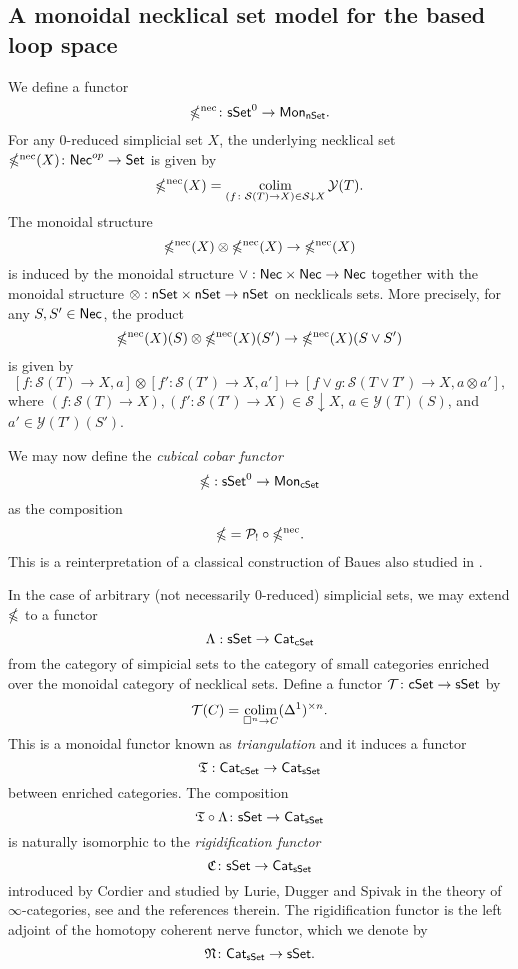 \subsection{A monoidal necklical set model for the based loop space}
We define a functor 
$$\mathbb{\Omega}^{\text{nec}} \colon \mathsf{sSet}^0 \to \mathsf{Mon}_{\mathsf{nSet}}.$$
For any $0$-reduced simplicial set $X$, the underlying necklical set $\mathbb{\Omega}^{\text{nec}}(X) \colon \mathsf{Nec}^{op} \to \mathsf{Set}$ is given by
$$\mathbb{\Omega}^{\text{nec}}(X) = \operatorname*{colim}_{(f \colon \mathcal{S}(T) \to X) \in  \mathcal{S} \downarrow X} \mathcal{Y}(T).$$
The monoidal structure $$\mathbb{\Omega}^{\text{nec}}(X) \otimes \mathbb{\Omega}^{\text{nec}}(X) \to \mathbb{\Omega}^{\text{nec}}(X)$$
is induced by the monoidal structure $\vee: \mathsf{Nec} \times \mathsf{Nec} \to \mathsf{Nec}$ together with the monoidal structure $\otimes: \mathsf{nSet} \times \mathsf{nSet} \to \mathsf{nSet}$ on necklicals sets. More precisely, for any $S, S' \in \mathsf{Nec}$, the product $$\mathbb{\Omega}^{\text{nec}}(X)(S) \otimes \mathbb{\Omega}^{\text{nec}}(X)(S') \to \mathbb{\Omega}^{\text{nec}}(X)(S \vee S')$$ is given by $$[f\colon \mathcal{S}(T) \to X, a] \otimes [f'\colon \mathcal{S}(T') \to X, a'] \mapsto [f \vee g\colon \mathcal{S}(T\vee T') \to X, a \otimes  a'],$$
where $(f\colon \mathcal{S}(T) \to X), (f'\colon \mathcal{S}(T') \to X) \in \mathcal{S} \downarrow X$, $a\in \mathcal{Y}(T)(S)$, and $a'\in \mathcal{Y}(T')(S')$.

We may now define the \textit{cubical cobar functor} $$\mathbb{\Omega}: \mathsf{sSet}^0 \to \mathsf{Mon}_{\mathsf{cSet}}$$ as the composition $$\mathbb{\Omega}= \mathcal{P}_! \circ \mathbb{\Omega}^{\text{nec}}.$$ This is a reinterpretation of a classical construction of Baues \cite{Baues} also studied in \cite{rivera-zeinalian-cubical}. 


\begin{remark}

In the case of arbitrary (not necessarily $0$-reduced) simplicial sets, we may extend  $\mathbb{\Omega}$ to a functor
$$\Lambda: \mathsf{sSet} \to \mathsf{Cat}_{\mathsf{cSet}}$$ from the category of simpicial sets to the category of small categories enriched over the monoidal category of necklical sets. Define a functor $\mathcal{T} \colon \mathsf{cSet} \to \mathsf{sSet}$ by $$\mathcal{T}(C) = \operatorname*{colim}_{\square^n \to C} (\Delta^1)^{\times n}.$$ This is a monoidal functor known as \textit{triangulation} and it induces a functor $$\mathfrak{T}: \mathsf{Cat}_{\mathsf{cSet}} \to \mathsf{Cat}_{\mathsf{sSet}}$$ between enriched categories. The composition 
$$\mathfrak{T} \circ \Lambda \colon \mathsf{sSet} \to \mathsf{Cat}_{\mathsf{sSet}}$$ is naturally isomorphic to the \textit{rigidification functor}
$$\mathfrak{C} \colon \mathsf{sSet} \to \mathsf{Cat}_{\mathsf{sSet}}$$
introduced by Cordier and studied by Lurie, Dugger and Spivak in the theory of $\infty$-categories, see \cite{rivera-zeinalian-cubical} and the references therein. The rigidification functor is the left adjoint of the homotopy coherent nerve functor, which we denote by
$$\mathfrak{N} \colon \mathsf{Cat}_{\mathsf{sSet}} \to \mathsf{sSet}.$$
\end{remark}

